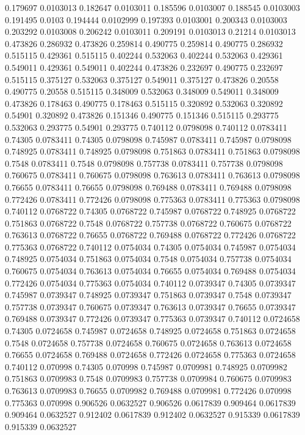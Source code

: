 0.179697 0.0103013
0.182647 0.0103011
0.185596 0.0103007
0.188545 0.0103003
0.191495 0.0103
0.194444 0.0102999
0.197393 0.0103001
0.200343 0.0103003
0.203292 0.0103008
0.206242 0.0103011
0.209191 0.0103013
0.21214 0.0103013
0.473826 0.286932
0.473826 0.259814
0.490775 0.259814
0.490775 0.286932
0.515115 0.429361
0.515115 0.402244
0.532063 0.402244
0.532063 0.429361
0.549011 0.429361
0.549011 0.402244
0.473826 0.232697
0.490775 0.232697
0.515115 0.375127
0.532063 0.375127
0.549011 0.375127
0.473826 0.20558
0.490775 0.20558
0.515115 0.348009
0.532063 0.348009
0.549011 0.348009
0.473826 0.178463
0.490775 0.178463
0.515115 0.320892
0.532063 0.320892
0.54901 0.320892
0.473826 0.151346
0.490775 0.151346
0.515115 0.293775
0.532063 0.293775
0.54901 0.293775
0.740112 0.0798098
0.740112 0.0783411
0.74305 0.0783411
0.74305 0.0798098
0.745987 0.0783411
0.745987 0.0798098
0.748925 0.0783411
0.748925 0.0798098
0.751863 0.0783411
0.751863 0.0798098
0.7548 0.0783411
0.7548 0.0798098
0.757738 0.0783411
0.757738 0.0798098
0.760675 0.0783411
0.760675 0.0798098
0.763613 0.0783411
0.763613 0.0798098
0.76655 0.0783411
0.76655 0.0798098
0.769488 0.0783411
0.769488 0.0798098
0.772426 0.0783411
0.772426 0.0798098
0.775363 0.0783411
0.775363 0.0798098
0.740112 0.0768722
0.74305 0.0768722
0.745987 0.0768722
0.748925 0.0768722
0.751863 0.0768722
0.7548 0.0768722
0.757738 0.0768722
0.760675 0.0768722
0.763613 0.0768722
0.76655 0.0768722
0.769488 0.0768722
0.772426 0.0768722
0.775363 0.0768722
0.740112 0.0754034
0.74305 0.0754034
0.745987 0.0754034
0.748925 0.0754034
0.751863 0.0754034
0.7548 0.0754034
0.757738 0.0754034
0.760675 0.0754034
0.763613 0.0754034
0.76655 0.0754034
0.769488 0.0754034
0.772426 0.0754034
0.775363 0.0754034
0.740112 0.0739347
0.74305 0.0739347
0.745987 0.0739347
0.748925 0.0739347
0.751863 0.0739347
0.7548 0.0739347
0.757738 0.0739347
0.760675 0.0739347
0.763613 0.0739347
0.76655 0.0739347
0.769488 0.0739347
0.772426 0.0739347
0.775363 0.0739347
0.740112 0.0724658
0.74305 0.0724658
0.745987 0.0724658
0.748925 0.0724658
0.751863 0.0724658
0.7548 0.0724658
0.757738 0.0724658
0.760675 0.0724658
0.763613 0.0724658
0.76655 0.0724658
0.769488 0.0724658
0.772426 0.0724658
0.775363 0.0724658
0.740112 0.070998
0.74305 0.070998
0.745987 0.0709981
0.748925 0.0709982
0.751863 0.0709983
0.7548 0.0709983
0.757738 0.0709984
0.760675 0.0709983
0.763613 0.0709983
0.76655 0.0709982
0.769488 0.0709981
0.772426 0.070998
0.775363 0.070998
0.906526 0.0632527
0.906526 0.0617839
0.909464 0.0617839
0.909464 0.0632527
0.912402 0.0617839
0.912402 0.0632527
0.915339 0.0617839
0.915339 0.0632527
